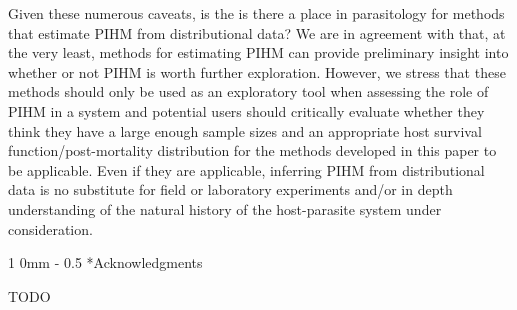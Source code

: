 \documentclass[12pt, a4paper]{article}
\makeatletter
\renewcommand{\section}{\@startsection
{section}%
{1}%
{0mm}%
{-\baselineskip}%
{0.5\baselineskip}%
{\normalfont\bf\large}} %
\makeatother
\begin{document}
Given these numerous caveats, is the is there a place in parasitology for methods that
estimate PIHM from distributional data?  We are in agreement with
\cite{Lester1984} that, at the very least, methods for estimating PIHM can
provide preliminary insight into whether or not PIHM is worth further
exploration.  However, we stress that these methods should only be used as an
exploratory tool when assessing the role of PIHM in a system and potential
users should critically evaluate whether they think they have a large enough
sample sizes and an appropriate host survival function/post-mortality distribution for the methods developed
in this paper to be applicable.  Even if they are applicable, inferring PIHM
from distributional data is no substitute for field or laboratory experiments
and/or in depth understanding of the natural history of the host-parasite
system under consideration.

\section*{Acknowledgments}

TODO

\singlespacing


\end{document}
